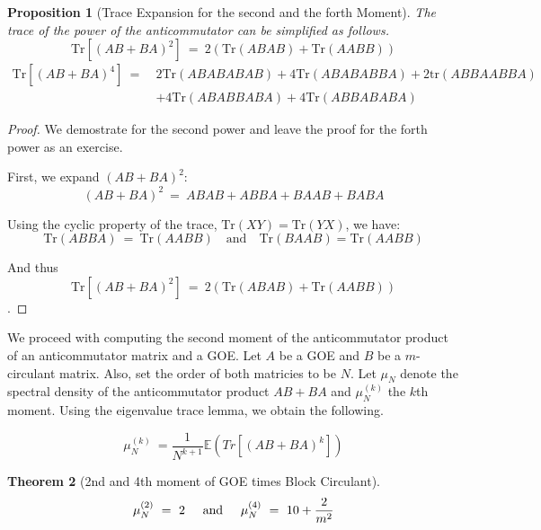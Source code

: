 \documentclass[12pt,reqno]{amsart}
\theoremstyle{plain} %
\newtheorem{theorem}{Theorem}[section]
\newtheorem{prop}[theorem]{Proposition}
\theoremstyle{remark}
\theoremstyle{definition}
\begin{document}
\begin{prop}[Trace Expansion for the second and the forth Moment]
The trace of the power of the anticommutator can be simplified as follows. 
\[
\text{Tr}[(AB + BA)^2]\ =\ 2(\text{Tr}(ABAB) + \text{Tr}(AABB))
\]
\[
\begin{aligned}
\text{Tr}[(AB + BA)^4] \ =\ & 2 \text{Tr}(ABABABAB) + 4 \text{Tr}(ABABABBA) + 2 \text{tr}(ABBAABBA) \\
& + 4 \text{Tr}(ABABBABA) + 4 \text{Tr}(ABBABABA)
\end{aligned}
\]
\end{prop}
\begin{proof}
We demostrate for the second power and leave the proof for the forth 
power as an exercise. 

First, we expand \((AB + BA)^2\):
\[
(AB + BA)^2 \ =\  ABAB + ABBA + BAAB + BABA
\]

Using the cyclic property of the trace, \(\text{Tr}(XY) = \text{Tr}(YX)\), we have:
\[
\text{Tr}(ABBA) \ =\ \text{Tr}(AABB) \quad \text{and} \quad \text{Tr}(BAAB) = \text{Tr}(AABB)
\]

And thus 
\[
\text{Tr}[(AB + BA)^2] \ =\ 2(\text{Tr}(ABAB) + \text{Tr}(AABB))
\]. 

\end{proof}

We proceed with computing the second moment of the 
anticommutator product of an anticommutator matrix 
and a GOE. Let $A$ be a GOE and $B$ be a $m$-circulant matrix. 
Also, set the order of both matricies to be $N$. 
Let $\mu_N$ denote the spectral density of the anticommutator product 
$AB + BA$ and $\mu_N^{(k)}$ the $k$th moment. 
Using 
the eigenvalue trace lemma, we obtain the following. 

\begin{equation}
    \mu_N^{(k)} \ = \frac 1 {N^{k + 1}} \mathbb{E}(Tr[(AB+BA)^k])
\end{equation}

\begin{theorem}[2nd and 4th moment of GOE times Block Circulant]
    \[
        \mu_N^{(2)} \ =\ 2 { \hspace{5mm} \textrm{and} \hspace{5mm} } 
        \mu_N^{(4)} \ =\ 10 + \frac 2 {m^2}
    \]
\end{theorem}
\end{document}

